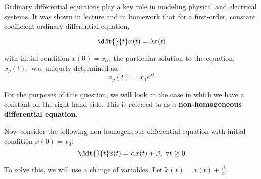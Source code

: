 


Ordinary differential equations play a key role in modeling physical and electrical systems.
It was shown in lecture and in homework that for a first-order, constant coefficient ordinary differential equation,

\begin{equation} \label{eq:h}
\ddt{}{t} x(t) = \lambda x(t)
\end{equation}

with initial condition $x(0) = x_0,$ the particular solution to the equation, $x_p(t),$ was uniquely determined as:
\begin{equation} \label{eq:hs}
x_p(t) = x_0 e^{\lambda t}
\end{equation}

For the purposes of this question, we will look at the case in which we have a constant on the right hand side.
This is referred to as a \textbf{non-homogeneous differential equation}.

Now consider the following non-homogeneous differential equation with initial condition $x(0) = x_0$:
\begin{equation} \label{eq:nh}
    \ddt{}{t} x(t)  = \alpha x(t) + \beta, \ \forall t \geq 0
\end{equation}


To solve this, we will use a change of variables.
Let $\widetilde{x}(t) = x(t) + \frac{\beta}{\alpha}$.

